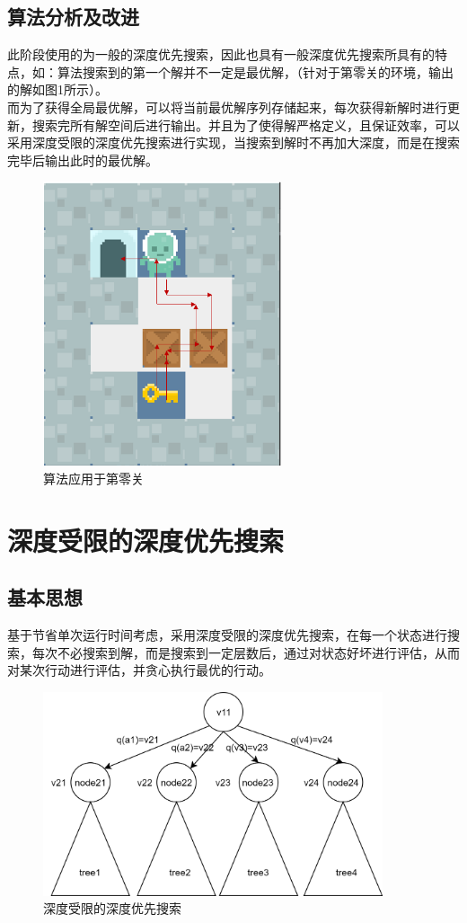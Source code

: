 \documentclass[UTF8]{article}
\begin{document}
\subsection{算法分析及改进}
\indent 此阶段使用的为一般的深度优先搜索，因此也具有一般深度优先搜索所具有的特点，如：算法搜索到的第一个解并不一定是最优解，（针对于第零关的环境，输出的解如图1所示）。\\
\indent 而为了获得全局最优解，可以将当前最优解序列存储起来，每次获得新解时进行更新，搜索完所有解空间后进行输出。并且为了使得解严格定义，且保证效率，可以采用深度受限的深度优先搜索进行实现，当搜索到解时不再加大深度，而是在搜索完毕后输出此时的最优解。\\

\begin{figure}[ht]
	\centering\includegraphics[width=7cm]{ai1-1.png}
	\caption{算法应用于第零关}
\end{figure}

\section{深度受限的深度优先搜索}

\subsection{基本思想}
\indent 基于节省单次运行时间考虑，采用深度受限的深度优先搜索，在每一个状态进行搜索，每次不必搜索到解，而是搜索到一定层数后，通过对状态好坏进行评估，从而对某次行动进行评估，并贪心执行最优的行动。\\

\begin{figure}[ht]
	\centering\includegraphics[width=10cm]{ai1-2.png}
	\caption{深度受限的深度优先搜索}
\end{figure}
\end{document}
